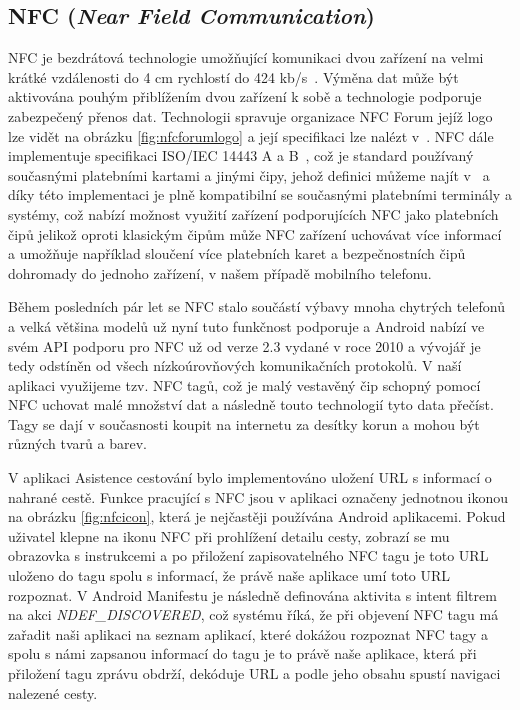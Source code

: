 \documentclass[czech,master,public,dept460,male,java,cpdeclaration]{diploma}
\begin{document}
\subsection{NFC (\textit{Near Field Communication})}\label{nfcsection}
NFC je bezdrátová technologie umožňující komunikaci dvou zařízení na velmi krátké vzdálenosti do 4 cm
rychlostí do 424 kb/s~\cite{nfcforum}. Výměna dat může být aktivována pouhým přiblížením dvou zařízení k sobě
a technologie podporuje zabezpečený přenos dat. Technologii spravuje organizace NFC Forum jejíž logo lze vidět
na obrázku \ref{fig:nfcforumlogo} a její specifikaci lze nalézt v~\cite{nfciso}.
NFC dále implementuje specifikaci ISO/IEC 14443 A a B~\cite{nfcforum}, což je standard používaný
současnými platebními kartami a jinými čipy, jehož definici můžeme najít v~\cite{rfidiso} a díky této
implementaci je plně kompatibilní se současnými platebními terminály a systémy, což nabízí možnost využití zařízení
podporujících NFC jako platebních čipů jelikož oproti klasickým čipům může NFC zařízení uchovávat více informací
a umožňuje například sloučení více platebních karet a bezpečnostních čipů dohromady do jednoho zařízení,
v našem případě mobilního telefonu.

Během posledních pár let se NFC stalo součástí výbavy mnoha chytrých telefonů a velká většina modelů
už nyní tuto funkčnost podporuje a Android nabízí ve svém API podporu pro NFC už od verze 2.3
vydané v roce 2010 a vývojář je tedy odstíněn od všech nízkoúrovňových komunikačních protokolů.
V naší aplikaci využijeme tzv. NFC tagů, což je malý vestavěný čip schopný pomocí NFC uchovat malé množství dat a
následně touto technologií tyto data přečíst. Tagy se dají v současnosti koupit na internetu za desítky
korun a mohou být různých tvarů a barev.

V aplikaci Asistence cestování bylo implementováno uložení URL s informací o nahrané cestě. Funkce
pracující s NFC jsou v aplikaci označeny jednotnou ikonou na obrázku \ref{fig:nfcicon},
která je nejčastěji používána Android aplikacemi.
 Pokud uživatel klepne na ikonu NFC při prohlížení detailu cesty, zobrazí se mu obrazovka s instrukcemi a po přiložení
zapisovatelného NFC tagu je toto URL uloženo do tagu spolu s informací, že právě naše aplikace umí toto URL
rozpoznat. V Android Manifestu je následně definována aktivita s intent filtrem na akci \textit{NDEF\_DISCOVERED},
což systému říká, že při objevení NFC tagu má zařadit naši aplikaci na seznam aplikací, které dokážou
rozpoznat NFC tagy a spolu s námi zapsanou informací do tagu je to právě naše aplikace, která při přiložení
tagu zprávu obdrží, dekóduje URL a podle jeho obsahu spustí navigaci nalezené cesty.
\end{document}
